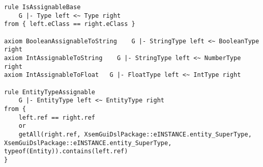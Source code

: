% 
% 

\begin{lstlisting}[language=xsemantics,float,label=lst:xsem-assignable,caption=Some
rules for the \mytt{isAssignable} judgment.] 
rule IsAssignableBase
	G |- Type left <~ Type right
from { left.eClass == right.eClass }

axiom BooleanAssignableToString    G |- StringType left <~ BooleanType right
axiom IntAssignableToString    G |- StringType left <~ NumberType right
axiom IntAssignableToFloat   G |- FloatType left <~ IntType right

rule EntityTypeAssignable
	G |- EntityType left <~ EntityType right
from {
	left.ref == right.ref
	or
	getAll(right.ref, XsemGuiDslPackage::eINSTANCE.entity_SuperType, XsemGuiDslPackage::eINSTANCE.entity_SuperType, typeof(Entity)).contains(left.ref)
}
\end{lstlisting}

